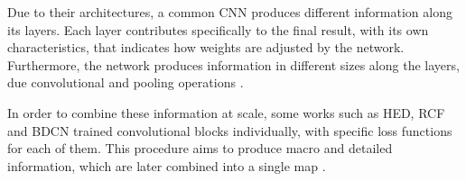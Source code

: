 \begin{comment}
In recent years, CNNs have emerged to solve increasingly complicated applications.
After the rise of CNNs, some architectures have emerged to produce region segmentation/classification and edge detection \cite[Ch. 1]{Goodfellow2016} \cite{Segnet:2017:7803544}.
In edge detection, HED architecture have emerged using intermediate outputs to produce maps in different scales, that are combined generating a final proposition \cite{HED:2015}.
\end{comment}

Due to their architectures, a common CNN produces different information along its layers.
Each layer contributes specifically to the final result, with its own characteristics, that indicates how weights are adjusted by the network.
Furthermore, the network produces information in different sizes along the layers, due convolutional and pooling operations \cite{VGGNET:2014} \cite{Zeiler:2014} \cite{Fidler:2007} \cite{Hadji:2018}. %

In order to combine these information at scale, some works such as HED, RCF and BDCN trained convolutional blocks individually, with specific loss functions for each of them.
This procedure aims to produce macro and detailed information, which are later combined into a single map \cite{Xie:2017:HED:3158436.3158453} \cite{RCF:2019} \cite{He:2019}. 

\begin{comment}
To enhance training speed and accuracy, many projects developed its own loss functions and techniques to combine intermediate results, extracted from the network and called side-outputs.
Also, they made some changes in well-known convolutional networks, as VGG16 \cite{VGGNET:2014} and ResNet \cite{RESNET:2016:7780459}, adding extra ones to create new features and refine intermediate results \cite{DeepStructured:2017:Xu20173962} \cite{COB:2016} \cite{ProeminentEdge:2018:Cai2018}.
\end{comment}

